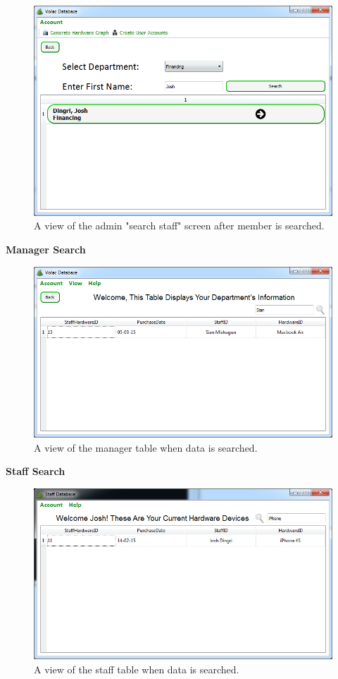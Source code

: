 \begin{figure}[H]
    \includegraphics[width=\textwidth]{./Evaluation/Images/afteradv.png}
    \caption{A view of the admin "search staff" screen after member is searched.} 
\end{figure}

\textbf{Manager Search}

\begin{figure}[H]
    \includegraphics[width=\textwidth]{./Evaluation/Images/managersearch.png}
    \caption{A view of the manager table when data is searched.} 
\end{figure}

\textbf{Staff Search}

\begin{figure}[H]
    \includegraphics[width=\textwidth]{./Evaluation/Images/staffsearch.png}
    \caption{A view of the staff table when data is searched.} 
\end{figure}

